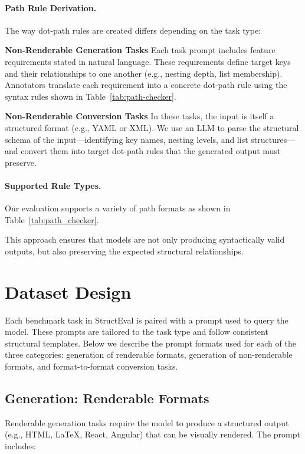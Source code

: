\paragraph{Path Rule Derivation.}
The way dot-path rules are created differs depending on the task type:

\textbf{Non-Renderable Generation Tasks} Each task prompt includes feature requirements stated in natural language. These requirements define target keys and their relationships to one another (e.g., nesting depth, list membership). Annotators translate each requirement into a concrete dot-path rule using the syntax rules shown in Table~\ref{tab:path-checker}.

\textbf{Non-Renderable Conversion Tasks} In these tasks, the input is itself a structured format (e.g., YAML or XML). We use an LLM to parse the structural schema of the input—identifying key names, nesting levels, and list structures—and convert them into target dot-path rules that the generated output must preserve.


\paragraph{Supported Rule Types.} Our evaluation supports a variety of path formats as shown in Table~\ref{tab:path_checker}.



This approach ensures that models are not only producing syntactically valid outputs, but also preserving the expected structural relationships. 


\section{Dataset Design}
\label{sec:appendix-prompts}

Each benchmark task in StructEval is paired with a prompt used to query the model. These prompts are tailored to the task type and follow consistent structural templates. Below we describe the prompt formats used for each of the three categories: generation of renderable formats, generation of non-renderable formats, and format-to-format conversion tasks.

\subsection{Generation: Renderable Formats}

Renderable generation tasks require the model to produce a structured output (e.g., HTML, LaTeX, React, Angular) that can be visually rendered. The prompt includes:

